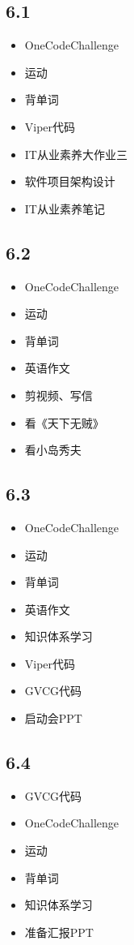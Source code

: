 \documentclass[UTF8]{ctexart}
\begin{document}
\subsection*{6.1}
\begin{itemize}
    \item OneCodeChallenge
    \item 运动
    \item 背单词
    \item Viper代码
    \item IT从业素养大作业三
    \item 软件项目架构设计
    \item IT从业素养笔记
\end{itemize}

\subsection*{6.2}
\begin{itemize}
    \item OneCodeChallenge
    \item 运动
    \item 背单词
    \item 英语作文
    \item 剪视频、写信
    \item 看《天下无贼》
    \item 看小岛秀夫
\end{itemize}

\subsection*{6.3}
\begin{itemize}
    \item OneCodeChallenge
    \item 运动
    \item 背单词
    \item 英语作文
    \item 知识体系学习
    \item Viper代码
    \item GVCG代码
    \item 启动会PPT
\end{itemize}

\subsection*{6.4}
\begin{itemize}
    \item GVCG代码
    \item OneCodeChallenge
    \item 运动
    \item 背单词
    \item 知识体系学习
    \item 准备汇报PPT
\end{itemize}
\end{document}
